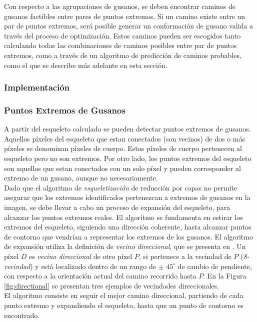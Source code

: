 Con respecto a las agrupaciones de gusanos, se deben encontrar caminos de gusanos factibles entre
pares de puntos extremos. Si un camino existe entre un par de puntos extremos, ser\'a posible
generar un conformaci\'on de gusano valida a trav\'es del proceso de optimizaci\'on. 
Estos caminos pueden ser escogidos tanto calculando todas las combinaciones de caminos posibles
entre par de puntos extremos, como a trav\'es de un algoritmo de predicci\'on de caminos probables,
como el que se describe m\'as adelante en esta secci\'on.

\subsubsection{Implementaci\'on}

\subsubsection*{Puntos Extremos de Gusanos}
\label{sec:wend}

A partir del esqueleto calculado se pueden detectar puntos extremos 
de gusanos. Aquellos p\'ixeles del esqueleto que estan conectados
(son vecinos) de dos o m\'as p\'ixeles se denominan p\'ixeles de cuerpo.
Estos p\'ixeles de cuerpo pertenecen al esqueleto pero no son extremos.
Por otro lado, los puntos extremos del esqueleto son aquellos que estan conectados con
un solo p\'ixel y pueden corresponder al extremo de un gusano, aunque no
necesariamente.\\

Dado que el algoritmo de \emph{esqueletizaci\'on} de reducci\'on por capas
no permite asegurar que los extremos identificados pertenezcan a extremos
de gusanos en la imagen, se debe llevar a cabo un proceso de expansi\'on
del esqueleto, para alcanzar los puntos extremos reales.
El algoritmo se fundamenta en estirar los extremos del esqueleto, siguiendo
una direcci\'on coherente, hasta alcanzar puntos de contorno que vendr\'ian a 
representar los extremos de los gusanos. El algoritmo de expansi\'on utiliza
la definici\'on de \emph{vecino direccional}, que se presenta en \cite[p.334]{maxima}.
Un p\'ixel $D$ es \emph{vecino direccional} de otro p\'ixel $P$, si pertenece a
la vecindad de $P$ (\emph{8-vecindad}) y est\'a localizado dentro de un rango de 
$\pm$ $45^{\circ}$  de cambio de pendiente, con respecto a la orientaci\'on actual
del camino recorrido hasta $P$. En la Figura \ref{fig:directional} se presentan 
tres ejemplos de vecindades direccionales.\\
El algoritmo consiste en seguir el mejor camino direccional, partiendo de cada
punto extremo y expandiendo el esqueleto, hasta que un punto de contorno es
encontrado.
 
